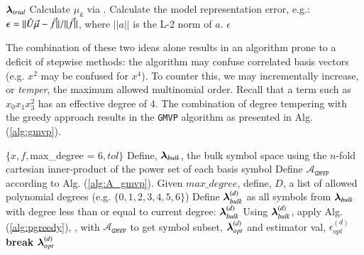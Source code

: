 \documentclass[twocolumn,aps,prd,floatfix,preprintnumbers,a4paper,nofootinbib,
superscriptaddress,10pt]{revtex4-1}
\def\gmvp#1{greedy-multivariate-polynomial#1
  (\texttt{GMVP}#1)\gdef\gmvp{\texttt{GMVP}}}
\begin{document}
{\scriptsize
\begin{algorithm}[H]
  \caption{$\mathcal{A}_{\gmvp}$, the action for \gmvp. Model calculation given basis symbols, and output of model error estimate.}
  \label{alg:A_gmvp}
  \begin{algorithmic}[1]
     ${\bm{\lambda}}_{trial}$
    \vskip 10pt
    \State Calculate $\mu_k$ via .
    \State Calculate the model representation error, e.g.: $\epsilon = ||\hat{U} \vec{\mu} - \vec{f}||/||\vec{f}||$, where $||a||$ is the L-2 norm of $a$.
    \vskip 10pt
     $\epsilon$
  \end{algorithmic}
\end{algorithm}
}
%
\par The combination of these two ideas alone results in an algorithm prone to a deficit of stepwise methods: the algorithm may confuse correlated basis vectors (e.g. $x^2$ may be confused for $x^4$).
%
To counter this, we may incrementally increase, or \textit{temper}, the maximum allowed multinomial order.
%
Recall that a term such as $x_0x_1x_3^2$ has an effective degree of 4.
%
The combination of degree tempering with the greedy approach results in the \gmvp{} algorithm as presented in Alg. (\ref{alg:gmvp}).
%
\hspace{1cm}
{\scriptsize
\begin{algorithm}[H]
  \caption{\gmvp{}, a degree tempered stepwise algorithm for multivariate polynomial modeling of scalar data.}
  \label{alg:gmvp}
  \begin{algorithmic}[1]
     $ \{ x, f, $max\_degree = 6$, tol \}$
    \vskip 10pt
    \State Define, ${\bm{\lambda}}_{bulk}$, the bulk symbol space using the $n$-fold cartesian inner-product of the power set of each basis symbol
    \State Define $\mathcal{A}_{\gmvp{}}$ according to Alg. (\ref{alg:A_gmvp}).
    \State Given $max\_degree$, define, ${ D}$, a list of allowed polynomial degrees (e.g. $\{0,1,2,3,4,5,6\}$)
      \State Define ${\bm{\lambda}}_{bulk}^{(d)}$ as all symbols from ${\bm{\lambda}}_{bulk}$ with degree less than or equal to current degree: ${\bm{\lambda}}^{(d)}_{bulk}$
      \State Using ${\bm{\lambda}}_{bulk}^{(d)}$, apply Alg. (\ref{alg:pgreedy}), \pgreedy{}, with $\mathcal{A}_{\gmvp{}}$ to get symbol subset, ${\bm{\lambda}}^{(d)}_{opt}$ and estimator val, $\epsilon^{(d)}_{opt}$
        \State \textbf{break}
      \EndIf
    \EndFor
    \vskip 10pt
     ${\bm{\lambda}}^{(d)}_{opt}$
  \end{algorithmic}
\end{algorithm}
}
%
%
\end{document}
